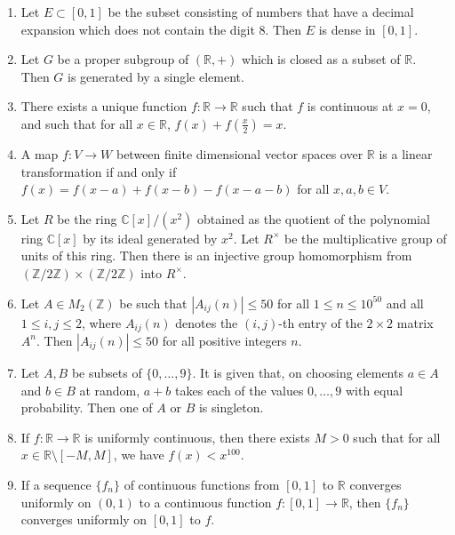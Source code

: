\documentclass[11pt, a4paper]{article}
\begin{document}
\begin{enumerate}
\[  \]
  for every choice of a positive integer $n$ and of $0 \le t_0 < t_1 < t_2 < \dots < t_n \le 1$.
  \item Let $E \subset [0,1]$ be the subset consisting of numbers that have a decimal expansion which does not contain the digit $8$. Then $E$ is dense in $[0,1]$.
  \item Let $G$ be a proper subgroup of $(\mathbb{R}, +)$ which is closed as a subset of $\mathbb{R}$. Then $G$ is generated by a single element.
  \item There exists a unique function $f: \mathbb{R} \to \mathbb{R}$ such that $f$ is continuous at $x = 0$, and such that for all $x \in \mathbb{R}$, $f(x) + f\left(\frac{x}{2}\right) = x$.
  \item A map $f: V \to W$ between finite dimensional vector spaces over $\mathbb{R}$ is a linear transformation if and only if $f(x) = f(x - a) + f(x - b) - f(x - a - b)$ for all $x, a, b \in V$.
  \item Let $R$ be the ring $\mathbb{C}[x]/(x^2)$ obtained as the quotient of the polynomial ring $\mathbb{C}[x]$ by its ideal generated by $x^2$. Let $R^\times$ be the multiplicative group of units of this ring. Then there is an injective group homomorphism from $(\mathbb{Z}/2\mathbb{Z}) \times (\mathbb{Z}/2\mathbb{Z})$ into $R^\times$.
  \item Let $A \in M_2(\mathbb{Z})$ be such that $|A_{ij}(n)| \le 50$ for all $1 \le n \le 10^{50}$ and all $1 \le i, j \le 2$, where $A_{ij}(n)$ denotes the $(i, j)$-th entry of the $2 \times 2$ matrix $A^n$. Then $|A_{ij}(n)| \le 50$ for all positive integers $n$.
  \item Let $A, B$ be subsets of $\{0, \dots, 9\}$. It is given that, on choosing elements $a \in A$ and $b \in B$ at random, $a + b$ takes each of the values $0, \dots, 9$ with equal probability. Then one of $A$ or $B$ is singleton.
  \item If $f: \mathbb{R} \to \mathbb{R}$ is uniformly continuous, then there exists $M > 0$ such that for all $x \in \mathbb{R} \setminus [-M, M]$, we have $f(x) < x^{100}$.
  \item If a sequence $\{f_n\}$ of continuous functions from $[0,1]$ to $\mathbb{R}$ converges uniformly on $(0,1)$ to a continuous function $f: [0,1] \to \mathbb{R}$, then $\{f_n\}$ converges uniformly on $[0,1]$ to $f$.
\end{enumerate}

\newpage

\end{document}
